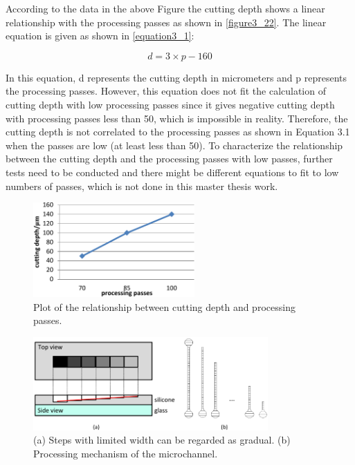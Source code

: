 \clearpage

According to the data in the above Figure the cutting depth shows a linear relationship with the processing passes as shown in \autoref{figure3_22}. The linear equation is given as shown in \autoref{equation3_1}:

\begin{equation}
    d=3\times p-160
    \label{equation3_1}
\end{equation}

In this equation, d represents the cutting depth in micrometers and p represents the processing passes. However, this equation does not fit the calculation of cutting depth with low processing passes since it gives negative cutting depth with processing passes less than 50, which is impossible in reality. Therefore, the cutting depth is not correlated to the processing passes as shown in Equation 3.1 when the passes are low (at least less than 50). To characterize the relationship between the cutting depth and the processing passes with low passes, further tests need to be conducted and there might be different equations to fit to low numbers of passes, which is not done in this master thesis work.

\begin{figure}[ht]%
\centering
\includegraphics[width=0.55\textwidth]{figures/designandfabrication/figure3_23}%
\caption{Plot of the relationship between cutting depth and processing passes.}%
\label{figure3_23}%
\end{figure}

\begin{figure}[h]%
\centering
\includegraphics[width=0.8\textwidth]{figures/designandfabrication/figure3_24}%
\caption{(a) Steps with limited width can be regarded as gradual. (b) Processing mechanism of the microchannel.}%
\label{figure3_24}%
\end{figure}

